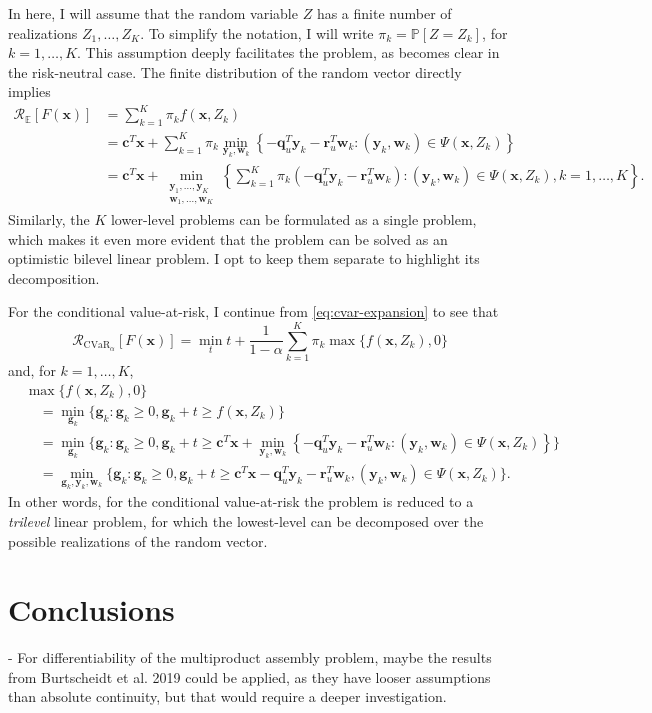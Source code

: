 \documentclass[12pt]{article}
\begin{document}
In here, I will assume that the random variable $Z$ has a finite number of realizations $Z_1,\ldots,Z_K$.
To simplify the notation, I will write $\pi_k=\mathbb{P}[Z=Z_k]$, for $k=1,\ldots,K$.
This assumption deeply facilitates the problem, as becomes clear in the risk-neutral case.
The finite distribution of the random vector directly implies~\citep[Theorem 5.1]{burtscheidtBilevelLinearOptimization2020}
\begin{align*}
    \mathcal{R}_{\mathbb{E}}[F(\bm{x})] &= \sum_{k=1}^{K} \pi_k f(\bm{x},Z_k) \\
    &= \bm{c}^{T}\bm{x} + \sum_{k=1}^{K} \pi_k \min_{\bm{y}_{k},\bm{w}_{k}}\left\{ -\bm{q}^{T}_u \bm{y}_{k} -\bm{r}^{T}_u \bm{w}_{k} : (\bm{y}_{k},\bm{w}_{k})\in \Psi(\bm{x},Z_k) \right\} \\
&= \bm{c}^{T}\bm{x} + \min_{\substack{\bm{y}_{1},\ldots,\bm{y}_{K} \\ \bm{w}_{1},\ldots,\bm{w}_{K}}}\left\{ \sum_{k=1}^{K} \pi_k (-\bm{q}^{T}_u \bm{y}_{k} -\bm{r}^{T}_u \bm{w}_{k}) : (\bm{y}_{k},\bm{w}_{k})\in \Psi(\bm{x},Z_k), k=1,\ldots,K \right\}
.\end{align*}
Similarly, the $K$ lower-level problems can be formulated as a single problem, which makes it even more evident that the problem can be solved as an optimistic bilevel linear problem.
I opt to keep them separate to highlight its decomposition.

For the conditional value-at-risk, I continue from \eqref{eq:cvar-expansion} to see that~\citep[Theorems 5.3 and 5.7]{burtscheidtRiskAverseModelsBilevel2019} \[
    \mathcal{R}_{\text{CVaR}_{\alpha}}[F(\bm{x})] = \min_{t} t + \frac{1}{1-\alpha} \sum_{k=1}^{K} \pi_k \max\{f(\bm{x},Z_k),0\}
\] 
and, for $k=1,\ldots,K$,
\begin{align*}
    &\max\{f(\bm{x},Z_k),0\} \\
    &\quad= \min_{\bm{g}_k} \{\bm{g}_k : \bm{g}_k \ge 0, \bm{g}_k+t \ge f(\bm{x},Z_k)\} \\
&\quad= \min_{\bm{g}_k} \{\bm{g}_k : \bm{g}_k \ge 0, \bm{g}_k+t \ge \bm{c}^{T}\bm{x} + \min_{\bm{y}_k,\bm{w}_k}\left\{ -\bm{q}^{T}_u \bm{y}_{k} -\bm{r}^{T}_u \bm{w}_{k} : (\bm{y}_{k},\bm{w}_{k})\in \Psi(\bm{x},Z_k) \right\} \} \\
    &\quad= \min_{\bm{g}_k,\bm{y}_{k},\bm{w}_{k}} \{\bm{g}_k : \bm{g}_k \ge 0, \bm{g}_k+t \ge \bm{c}^{T}\bm{x} -\bm{q}^{T}_u \bm{y}_{k} -\bm{r}^{T}_u \bm{w}_{k} , (\bm{y}_{k},\bm{w}_{k})\in \Psi(\bm{x},Z_k) \}
.\end{align*}
In other words, for the conditional value-at-risk the problem is reduced to a \emph{trilevel} linear problem, for which the lowest-level can be decomposed over the possible realizations of the random vector.


\section*{Conclusions}


- For differentiability of the multiproduct assembly problem, maybe the results from Burtscheidt et al. 2019 could be applied, as they have looser assumptions than absolute continuity, but that would require a deeper investigation.



% 
\printbibliography
    
\end{document}
